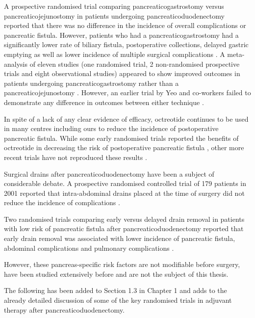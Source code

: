 	A prospective randomised trial comparing pancreaticogastrostomy versus pancreaticojejunostomy in patients undergoing pancreaticoduodenectomy reported that there was no difference in the incidence of overall complications or pancreatic fistula. 
	However, patients who had a pancreaticogastrostomy had a significantly lower rate of biliary fistula, postoperative collections, delayed gastric emptying as well as lower incidence of multiple surgical complications \parencite{bassi_reconstruction_2005}. 
	A meta-analysis of eleven studies (one randomised trial, 2 non-randomised prospective trials and eight observational studies) appeared to show improved outcomes in patients undergoing pancreaticogastrostomy rather than a pancreaticojejunostomy \parencite{mckay_meta-analysis_2006}. 
	However, an earlier trial by Yeo and co-workers failed to demonstrate any difference in outcomes between either technique \parencite{yeo_prospective_1995}.
	
	In spite of a lack of any clear evidence of efficacy, octreotide continues to be used in many centres including ours to reduce the incidence of postoperative pancreatic fistula. 
	While some early randomised trials reported the benefits of octreotide in decreasing the risk of postoperative pancreatic fistula \parencite{montorsi_efficacy_1995,nakatsuka_octreotide_2000}, other more recent trials have not reproduced these results \parencite{lowy_prospective_1997, yeo_does_2000, kollmar_prophylactic_2008}. 
	
	Surgical drains after pancreaticoduodenectomy have been a subject of considerable debate. 
	A prospective randomised controlled trial of 179 patients in 2001 reported that intra-abdominal drains placed at the time of surgery did not reduce the incidence of complications \parencite{conlon_prospective_2001}.
	
	Two randomised trials comparing early versus delayed drain removal in patients with low risk of pancreatic fistula after pancreaticoduodenectomy reported that early drain removal was associated with lower incidence of pancreatic fistula, abdominal complications and pulmonary complications \parencite{kawai_early_2006,bassi_early_2010}. 
	
	However, these pancreas-specific risk factors are not modifiable before surgery, have been studied extensively before and are not the subject of this thesis.
		
	The following has been added to Section 1.3 in Chapter 1 and adds to the already detailed discussion of some of the key randomised trials in adjuvant therapy after pancreaticoduodenectomy.
	

